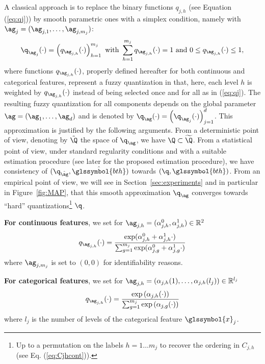 A classical approach is to replace the binary functions $q_{j,h}$ (see Equation (\ref{eq:qj}))  by smooth parametric ones  with a simplex condition, namely with $\ag_j=(\ag_{j,1},\ldots, \ag_{j,m_j})$:
\begin{equation*}
    {\q_{\ag_j}(\cdot)=\left(q_{\ag_{j,h}}(\cdot)\right)_{h=1}^{m_j} \text{ with } \sum_{h=1}^{m_j}q_{\ag_{j,h}}(\cdot)=1 \text{ and } 0 \leq q_{\ag_{j,h}}(\cdot) \leq 1,}
\end{equation*}
where functions $q_{\ag_{j,h}}(\cdot)$, properly defined hereafter for both continuous and categorical features, represent a fuzzy quantization in that, here, each level $h$ is weighted by $q_{\ag_{j,h}}(\cdot)$ instead of being selected once and for all as in (\ref{eq:qj}). The resulting fuzzy quantization for all components depends on the global parameter $\ag = (\ag_1, \ldots, \ag_d)$ and is denoted by $\q_{\ag}(\cdot)=\left(\q_{\ag_j}(\cdot)\right)_{j=1}^d$. This approximation is justified by the following arguments. From a deterministic point of view, denoting by $\tilde{\Q}$ the space of $\q_{\ag}$, we have $\Q \subset \widetilde{\Q}$. From a statistical point of view, under standard regularity conditions and with a suitable estimation procedure (see later for the proposed estimation procedure), we have consistency of $(\q_{\hat{\ag}}, \hat{\glssymbol{bth}})$ towards $(\q,\glssymbol{bth})$. From an empirical point of view, we will see in Section~\ref{sec:experiments} and in particular in Figure~\ref{fig:MAP}, that this smooth approximation $\q_{\ag}$ converges towards ``hard'' quantizations\footnote{Up to a permutation on the labels $h=1 \ldots m_j$ to recover the ordering in $C_{j,h}$ (see Eq. (\ref{eq:Cjhcont})).} $\q$.



 {\bf For continuous features}, we set for $\ag_{j,h} = (\alpha^0_{j,h},\alpha^1_{j,h}) \in \mathbb{R}^2$
\[q_{\ag_{j,h}}(\cdot) = \frac{\exp(\alpha^0_{j,h} + \alpha^1_{j,h}  \cdot)}{\sum_{g=1}^{m_j} \exp(\alpha^0_{j,g} + \alpha^1_{j,g}  \cdot)}\]
where $\ag_{j,m_j}$ is set to $(0,0)$ for identifiability reasons.




{\bf For categorical features}, we set for $\ag_{j,h}=\left(\alpha_{j,h}(1),\ldots, \alpha_{j,h}(l_j)\right) \in \mathbb{R}^{l_j}$
\[q_{\ag_{j,h}}(\cdot) = \frac{\exp\left(\alpha_{j,h}(\cdot)\right)}{\sum_{g=1}^{m_j} \exp\left(\alpha_{j,g}(\cdot)\right)}\]
where $l_j$ is the number of levels of the categorical feature $\glssymbol{x}_j$.

